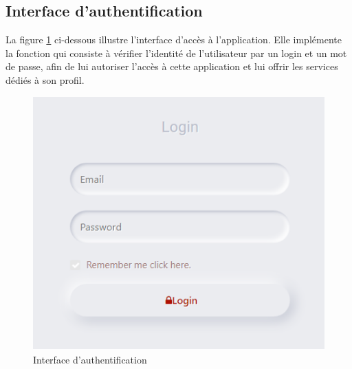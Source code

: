 \subsection{	Interface d’authentification}
\hspace{4mm}La figure \ref{fig:interface_auth} ci-dessous illustre l’interface d’accès à l’application. Elle implémente la fonction qui consiste à vérifier l’identité de l’utilisateur par un login et un mot de passe, afin de lui autoriser l’accès à cette application et lui offrir les services dédiés à son profil.
\begin{figure}[h]
    \centering
    \includegraphics{figures/33anis17.png}
    \caption{Interface d’authentification}
    \label{fig:interface_auth}
\end{figure}
